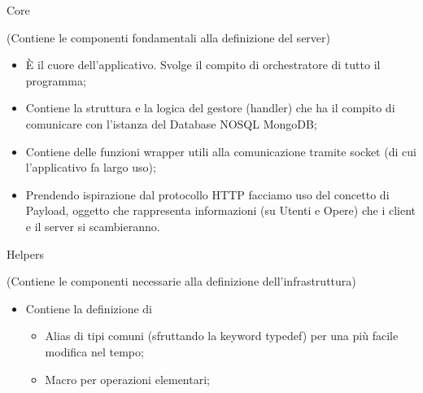     \begin{minipage}{0.45\textwidth}
      \begin{center}
        {\Huge Core}

        (Contiene le componenti fondamentali alla definizione del server)
      \end{center}
      \vspace{0.5cm}

      \begin{itemize}
        \setlength\itemsep{1em}
        \item {} \rightarrow È il cuore dell’applicativo. Svolge il compito di orchestratore di tutto il programma;
        \item {} \rightarrow Contiene la struttura e la logica del gestore (handler) che ha il compito di comunicare con l’istanza del Database NOSQL MongoDB;
        \item {} \rightarrow Contiene delle funzioni wrapper utili alla comunicazione tramite socket (di cui l’applicativo fa largo uso);
        \item {} \rightarrow Prendendo ispirazione dal protocollo HTTP facciamo uso del concetto di Payload, oggetto che rappresenta informazioni (su Utenti e Opere) che i client e il server si scambieranno.
      \end{itemize}

      \vspace{1cm}

      \begin{center}
        {\Huge Helpers}

        (Contiene le componenti necessarie alla definizione dell’infrastruttura)
      \end{center}
      \vspace{0.5cm}

      \begin{itemize}
        \setlength\itemsep{1em}
        \item {} \rightarrow Contiene la definizione di \begin{itemize} \item Alias di tipi comuni (sfruttando la keyword typedef) per una più facile modifica nel tempo; \item Macro per operazioni elementari; \end{itemize}


\end{itemize}
\end{minipage}
